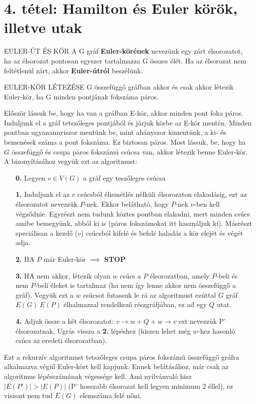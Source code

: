 \section{4. tétel: Hamilton és Euler körök, illetve utak}

\begin{definicio}{EULER-ÚT ÉS KÖR}
A G gráf \textbf{Euler-körének} nevezünk egy zárt élsorozatot, ha az élsorozat pontosan egyszer tartalmazza G összes élét. Ha az élsorozat nem feltétlenül zárt, akkor \textbf{Euler-útról} beszélünk.
\end{definicio}

\begin{tetel}{EULER-KÖR LÉTEZÉSE}
G összefüggő gráfban akkor és csak akkor létezik Euler-kör, ha G minden pontjának fokszáma páros.
\end{tetel}

\begin{bizonyitas}{}
  Először lássuk be, hogy ha van a gráfban E-kör, akkor minden pont foka páros. Induljunk el a gráf tetszőleges pontjából és járjuk körbe az E-kör mentén. Minden pontban ugyanannyiszor mentünk be, mint ahányszor kimentünk, a ki- és bemenések száma a pont fokszáma. Ez biztosan páros.
Most lássuk, be, hogy ha $G$ összefüggő és csupa páros fokszámú csúcsa van, akkor létezik benne Euler-kör. A bizonyításához vegyük ezt az algoritmust:
\begin{itemize}
\item[\textbf{0.}] Legyen $v \in V(G)$ a gráf egy teszőleges csúcsa
\item[\textbf{1.}] Induljunk el az $v$ csúcsból élismétlés nélküli élsorozaton elakadásig, ezt az élsorozatot nevezzük $P$-nek. Ekkor belátható, hogy $P$-nek $v$-ben kell végződnie. Egyrészt nem tudunk köztes pontban elakadni, mert minden csúcs amibe bemegyünk, abból ki is (páros fokszámokat itt használjuk ki). Másrészt speciálisan a kezdő ($v$) csúcsból kifelé és befelé haladás a kör elejét és végét adja.
\item[\textbf{2.}] HA $P$ már Euler-kör $\implies$ \textbf{STOP}
\item[\textbf{3.}] HA nem akkor, létezik olyan $w$ csúcs a $P$ élsorozatban, amely $P$-beli és nem $P$-beli éleket is tartalmaz (ha nem így lenne akkor nem összefüggő a gráf). Vegyük ezt a $w $ csúcsot futassuk le rá az algoritmust ezúttal $G$ gráf $E(G) \ E(P)$ élhalmazzal rendelkező részgráfjában, ez ad egy $Q$ utat.
\item[\textbf{4.}] Adjuk össze a két élsorozatot: $v \rightarrow w + Q + w \rightarrow v$ ezt nevezzük P' élsorozatnak. Ugrás vissza a \textbf{2.} lépéshez (hiszen lehet még $w$-hez hasonló csúcs az eredeti élsorozatban).
\end{itemize}
Ezt a rekurzív algoritmust tetszőleges csupa páros fokszámú összefüggő gráfra alkalmazva végül Euler-kört kell kapjunk. Ennek belátásához, már csak az algoritmus lépésszámának végessége kell. Ami nyilvánvaló hisz $|E(P')| > |E(P)|$ (P' hosszabb élsorozat kell legyen minimum 2 éllel), ez viszont nem tud $E(G)$ elemszáma felé nőni.
\end{bizonyitas}

